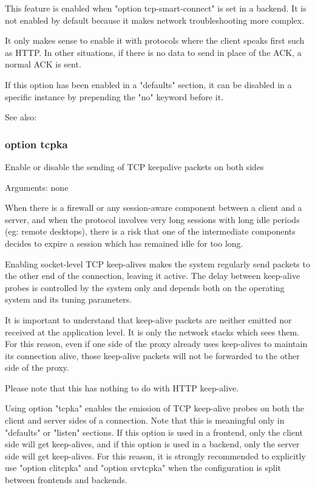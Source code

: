   This feature is enabled when "option tcp-smart-connect" is set in a backend.
  It is not enabled by default because it makes network troubleshooting more
  complex.

  It only makes sense to enable it with protocols where the client speaks first
  such as HTTP. In other situations, if there is no data to send in place of
  the ACK, a normal ACK is sent.

  If this option has been enabled in a "defaults" section, it can be disabled
  in a specific instance by prepending the "no" keyword before it.

  See also: 


\subsubsection[option tcpka]{option tcpka}


  Enable or disable the sending of TCP keepalive packets on both sides


  Arguments: none

  When there is a firewall or any session-aware component between a client and
  a server, and when the protocol involves very long sessions with long idle
  periods (eg: remote desktops), there is a risk that one of the intermediate
  components decides to expire a session which has remained idle for too long.

  Enabling socket-level TCP keep-alives makes the system regularly send packets
  to the other end of the connection, leaving it active. The delay between
  keep-alive probes is controlled by the system only and depends both on the
  operating system and its tuning parameters.

  It is important to understand that keep-alive packets are neither emitted nor
  received at the application level. It is only the network stacks which sees
  them. For this reason, even if one side of the proxy already uses keep-alives
  to maintain its connection alive, those keep-alive packets will not be
  forwarded to the other side of the proxy.

  Please note that this has nothing to do with HTTP keep-alive.

  Using option "tcpka" enables the emission of TCP keep-alive probes on both
  the client and server sides of a connection. Note that this is meaningful
  only in "defaults" or "listen" sections. If this option is used in a
  frontend, only the client side will get keep-alives, and if this option is
  used in a backend, only the server side will get keep-alives. For this
  reason, it is strongly recommended to explicitly use "option clitcpka" and
  "option srvtcpka" when the configuration is split between frontends and
  backends.

